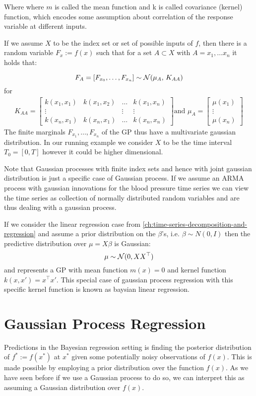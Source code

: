 Where where $m$ is called the mean function and k is called covariance (kernel) function, which encodes some assumption
about correlation of the response variable at different inputs.

If we assume $X$ to be the index set or set of possible inputs of $f$, then there is a random variable
$F_x := f(x)$ such that for a set $A \subset X$ with $A={x_1, \dots x_n}$ it holds that:

\[F_A = [F_{x_0}, \dots , F_{x_n}] \sim \operatorname{\mathcal{N}}(\mu_A,\,K_{AA})\]
for
\begin{gather}
    K_{AA} =
    \begin{bmatrix}
        k(x_1, x_1) & k(x_1, x_2) & \dots & k(x_1, x_n)\\
        \vdots  &  & \vdots  & \vdots \\
        k(x_n, x_1)  & k(x_n, x_1) & \dots  & k(x_n, x_n)
    \end{bmatrix} \text{and }
    \mu_A =
    \begin{bmatrix}
        \mu(x_1) \\
        \vdots \\
        \mu(x_n)
    \end{bmatrix}
\end{gather}
The finite marginals $F_{x_1}, \dots, F_{x_n}$ of the GP thus have a multivariate gaussian distribution.
In our running example we consider $X$ to be the time interval $T_0=[0, T]$ however it could be higher dimensional.

Note that Gaussian processes with finite index sets and hence with joint gaussian distribution is just a specific case
of Gaussian process. If we assume an ARMA process with gaussian innovations for the blood pressure time series
we can view the time series
as collection of normally distributed random variables and are thus dealing with a gaussian process.


If we consider the linear regression case from \ref{ch:time-series-decomposition-and-regression} and assume a
prior distribution
on the $\beta$'s, i.e. $\beta \sim N(0, I)$ then the predictive distribution over $\mu = X \beta$ is Gaussian:
\[
    \mu \sim \operatorname{\mathcal{N}}(0, XX^{\top})
\]
and represents a GP with mean function $m(x) = 0$ and kernel function $k(x, x') = x^{\top}x'$.
This special case of gaussian process regression with this specific kernel function is known as baysian linear regression.


\section{Gaussian Process Regression}
Predictions in the Bayesian regression setting is finding the posterior distribution of  $f^{\ast} := f(x^{\ast})$ at $x^{\ast}$
given some potentially noisy observations of $f(x)$. This is made possible by employing a prior distribution
over the function $f(x)$. As we have seen before if we use a Gaussian process to do so, we can interpret this as
assuming a Gaussian distribution over $f(x)$.


